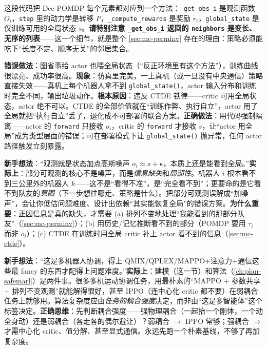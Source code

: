 这段代码把 Dec-POMDP 每个元素都对应到一个方法：\verb|_get_obs_i| 是观测函数 $O_i$，\verb|step| 里的动力学是转移 $P$，\verb|_compute_rewards| 是奖励 $r_i$，\verb|global_state| 是仅训练可用的全局状态 $s$。\textbf{请特别注意 \texttt{\_get\_obs\_i} 返回的 \texttt{neighbors} 是变长、无序的列表}——这一个细节，就是整个 \cref{sec:mc-perminv} 存在的理由：策略必须能吃下“长度不定、顺序无关”的邻居集合。

\begin{pitfall}
\textbf{错误做法}：图省事给 actor 也喂全局状态（“反正环境里有这个方法”），训练曲线很漂亮、成功率很高。\textbf{现象}：仿真里完美，一上真机（或一旦没有中央通信）策略直接失效——真机上每个机器人拿不到 \verb|global_state()|，actor 输入分布和训练时完全不同，输出垃圾动作。\textbf{根本原因}：违反 CTDE 铁律——critic 可用全局状态，actor 绝不可以。CTDE 的全部价值就在“训练作弊、执行自立”，actor 用了全局就把“执行自立”丢了，退化成不可部署的联合方案。\textbf{正确做法}：用代码强制隔离——actor 的 \verb|forward| 只接收 $o_i$，critic 的 \verb|forward| 才接收 $s$，让“actor 用全局”成为类型层面的错误；可在部署模式下让 \verb|global_state()| 抛异常，任何 actor 路径触发立刻暴露。
\end{pitfall}

\begin{pitfall}
\textbf{新手想法}：“观测就是状态加点高斯噪声 $o_i\approx s+\boldsymbol{\epsilon}$，本质上还是能看到全局。”\textbf{实际上}：部分可观测的核心不是噪声，而是\emph{信息缺失}和\emph{局部性}。机器人 $i$ 根本看不到三公里外的机器人 $k$——这不是“看得不准”，是“完全看不到”；更要命的是它看不到队友的\emph{意图}（下一步想往哪走、策略是什么）。把部分可观测误解成“加噪声”，会让你低估问题难度、设计出依赖“其实能恢复全局”的错误方案。\textbf{为什么重要}：正因信息是真的缺失，才需要 (a) 排列不变地处理“我能看到的那部分队友”（\cref{sec:mc-perminv}）；(b) 用历史/记忆推断看不到的部分（POMDP 要用 $\tau_i$ 而非 $o_i$）；(c) CTDE 在训练时用全局 critic 补上 actor 看不到的信息（\cref{sec:mc-ctde}）。
\end{pitfall}

\begin{pitfall}
\textbf{新手想法}：“这是多机器人协调，得上 QMIX/QPLEX/MAPPO$+$注意力$+$通信这些最 fancy 的东西才配得上问题难度。”\textbf{实际上}：建模（这一节）和算法（\cref{ch:plan-safemarl}）是两件事。很多多机运动协调任务，用最朴素的“MAPPO $+$ 参数共享 $+$ 排列不变观测”就能解得很好，甚至 IPPO（连中心化 critic 都不要）在弱耦合任务上就够用。算法复杂度应由\emph{任务的耦合强度}决定，而非由“这是多智能体”这个标签决定。\textbf{正确思维}：先判断耦合强度——强物理耦合（一起抬一个刚体，一个动全身动）还是弱耦合（各走各的偶尔避让）？弱耦合 $\to$ IPPO 常够；强耦合 $\to$ 才需中心化 critic、值分解、甚至显式通信。永远先跑一个朴素基线，不够了再加复杂度。
\end{pitfall}


